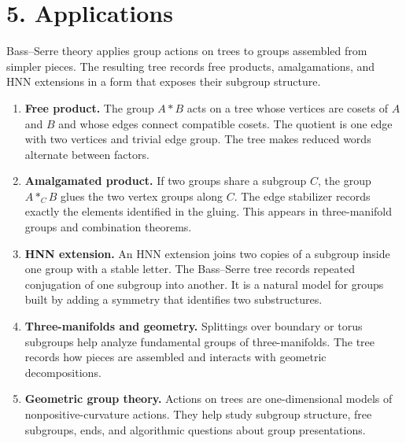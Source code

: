 \section*{5. Applications}
Bass--Serre theory applies group actions on trees to groups assembled from simpler pieces. The resulting tree records free products, amalgamations, and HNN extensions in a form that exposes their subgroup structure.
\begin{enumerate}[leftmargin=*,itemsep=0.35em]
\item \textbf{Free product.} The group $A*B$ acts on a tree whose vertices are cosets of $A$ and $B$ and whose edges connect compatible cosets. The quotient is one edge with two vertices and trivial edge group. The tree makes reduced words alternate between factors.
\item \textbf{Amalgamated product.} If two groups share a subgroup $C$, the group $A*_C B$ glues the two vertex groups along $C$. The edge stabilizer records exactly the elements identified in the gluing. This appears in three-manifold groups and combination theorems.
\item \textbf{HNN extension.} An HNN extension joins two copies of a subgroup inside one group with a stable letter. The Bass--Serre tree records repeated conjugation of one subgroup into another. It is a natural model for groups built by adding a symmetry that identifies two substructures.
\item \textbf{Three-manifolds and geometry.} Splittings over boundary or torus subgroups help analyze fundamental groups of three-manifolds. The tree records how pieces are assembled and interacts with geometric decompositions.
\item \textbf{Geometric group theory.} Actions on trees are one-dimensional models of nonpositive-curvature actions. They help study subgroup structure, free subgroups, ends, and algorithmic questions about group presentations.
\end{enumerate}


